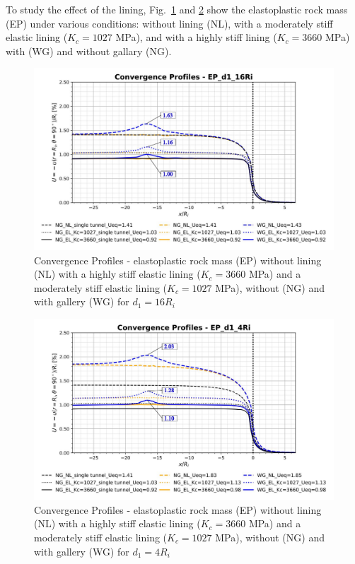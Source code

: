 \documentclass[a4paper,fleqn]{cas-sc}
\begin{document}
To study the effect of the lining, Fig.~\ref{EP_d1_16Ri} and \ref{EP_d1_4Ri} show the elastoplastic rock mass (EP) under various conditions: without lining (NL), with a moderately stiff elastic lining ($K_c = 1027$ MPa), and with a highly stiff lining ($K_c = 3660$ MPa) with (WG) and without gallary (NG).

\begin{figure}[h!]
	\centering
	\includegraphics[scale=0.5]{Convergence Profiles - EP_d1_16Ri.pdf}
	\caption{Convergence Profiles - elastoplastic rock mass (EP) without lining (NL) with a highly stiff elastic lining ($K_c = 3660$ MPa) and a moderately stiff elastic lining ($K_c = 1027$ MPa), without (NG) and with gallery (WG) for $d_1 = 16R_i$}
	\label{EP_d1_16Ri}
\end{figure}
\FloatBarrier

\begin{figure}[h!]
	\centering
	\includegraphics[scale=0.5]{Convergence Profiles - EP_d1_4Ri.pdf}
	\caption{Convergence Profiles - elastoplastic rock mass (EP) without lining (NL) with a highly stiff elastic lining ($K_c = 3660$ MPa) and a moderately stiff elastic lining ($K_c = 1027$ MPa), without (NG) and with gallery (WG) for $d_1 = 4R_i$}
	\label{EP_d1_4Ri}
\end{figure}
\FloatBarrier
\end{document}
